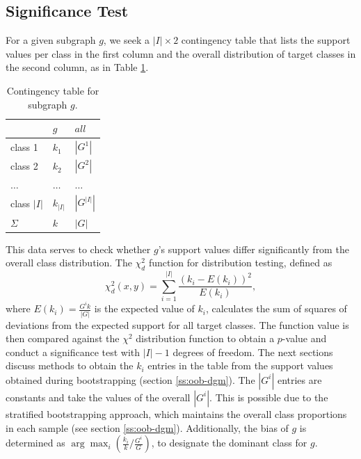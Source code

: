 \documentclass{sig-alternate}
\begin{document}
\subsection{Significance Test}
\label{ss:significance-test}
For a given subgraph $g$, we seek a $|I| \times 2$ contingency table that lists the
support values per class in the first column and the overall distribution of target
classes in the second column, as in Table \ref{t-ContingencyTableIndTest}.
\begin{table}[t]
  \centering
  \begin{tabular}{|l|l|l|}
    \hline
    ~           &	$g$       & $all$       \\\hline
    class 1	    &	$k_1$     & $|G^1|$     \\\hline
    class 2 	  &	$k_2$     & $|G^2|$     \\\hline
    $\ldots$ 	  &	$\ldots$  & $\ldots$    \\\hline
    class $|I|$	&	$k_{|I|}$ & $|G^{|I|}|$ \\\hline
    $\Sigma$	  &	$k$       & $|G|$       \\\hline
  \end{tabular}
  \caption[]{Contingency table for subgraph $g$.}
  \label{t-ContingencyTableIndTest}
\end{table}
This data serves to check whether $g$'s support values differ
significantly from the overall class distribution.  The $\chi^2_d$ function for
distribution testing, defined as
\begin{equation}
  \chi^2_d(x,y) = \sum_{i=1}^{|I|} \frac{(k_i-E(k_i))^2}{E(k_i)},
  \label{eq:chid}
\end{equation} 
where $E(k_i)=\frac{G^{i}k}{|G|}$ is the expected value of $k_i$, calculates
the sum of squares of deviations from the expected support for all target
classes. The function value is then compared against the $\chi^2$
distribution function to obtain a $p$-value and conduct a significance test with
$|I|-1$ degrees of freedom.  The next sections discuss methods to obtain the
$k_i$ entries in the table from the support values obtained during bootstrapping (section
\ref{ss:oob-dgm}).  The $|G^{i}|$ entries are constants and take the values of
the overall $|G^{i}|$.  This is possible due to the stratified bootstrapping approach,
which maintains the overall class proportions in each sample (see section
\ref{ss:oob-dgm}). 
Additionally, the bias of $g$ is determined as $\arg\max_i (\frac{k_i}{k}/\frac{G^i}{G})$, to designate the dominant class for $g$.
\end{document}
